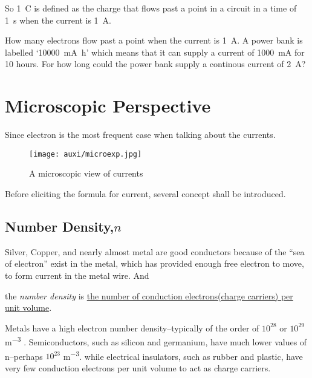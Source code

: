 \documentclass[a4paper]{tufte-handout}
\newenvironment{TaskBox} %
{\begin{tcolorbox}[breakable,colback=b1!30,colframe=b1,title=Task]} {\end{tcolorbox}}
\newenvironment{SummBox}
{\begin{tcolorbox}[breakable,colback=r1!30,colframe=r1,title=Summary]} {\end{tcolorbox}}
\begin{document}
So \SI{1}{\coulomb} is defined as the charge that flows past a point in a circuit in a time of \SI{1}{\s} when the current is \SI{1}{\ampere}.

\begin{TaskBox}
How many electrons flow past a point when the current is \SI{1}{\A}.
\vspace{1in}
\tcblower
A power bank is labelled `\SI{10000}{\milli\ampere\hour}' which means that it can supply a current of \SI{1000}{\milli\A} for 10 hours. For how long could the power bank supply a continous current of \SI{2}{\A}?
\vspace{1in}
\end{TaskBox}

\section{Microscopic Perspective}
Since electron is the most frequent case when talking about the currents.
\begin{figure}[h]
\centering
\texttt{[image: auxi/microexp.jpg]}
\caption{A microscopic view of currents}
\label{fig:microscopic view}
\end{figure}
Before eliciting the formula for current, several concept shall be introduced.

\subsection{Number Density,$n$}
Silver, Copper, and nearly almost metal are good conductors because of the ``sea of electron'' exist in the metal, which has provided enough free electron to move, to form current in the metal wire. And 
\begin{SummBox}
the \emph{number density} is \uline{the number of conduction electrons(charge carriers) per unit volume}.
\end{SummBox}
Metals have a high electron number density–typically of the order of $10^{28}$ or $10^{29}$ \si{\m^{-3}} . Semiconductors, such as silicon and germanium, have much lower values of n–perhaps $10^{23}$ \si{\m^{-3}}. while electrical insulators, such as rubber and plastic, have very few conduction electrons per unit volume to act as charge carriers.
\end{document}
